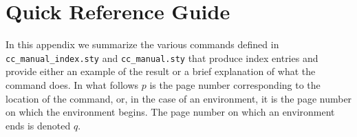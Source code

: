 \appendix
\section{Quick Reference Guide}
\newcommand{\Indent}{\hspace*{15pt}}

\normalsize
In this appendix we summarize the various commands defined in
{\tt cc\_manual\_index.sty} and {\tt cc\_manual.sty} that produce
index entries and provide either an example of the result or a
brief explanation of what the command does.  In what follows $p$ is the
page number corresponding to the location of the command, or, in the case
of an environment, it is the page number on which the environment begins.
The page number on which an environment ends is denoted $q$.

